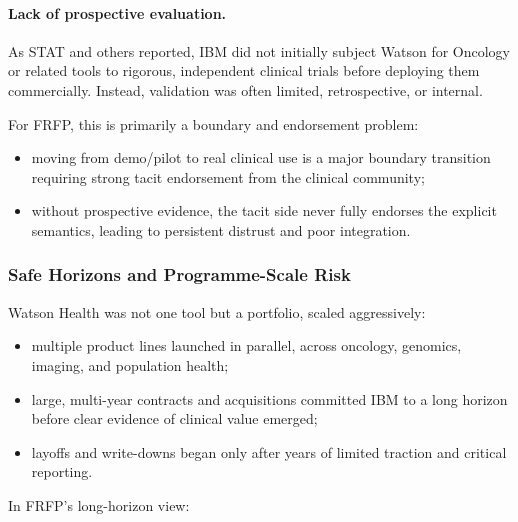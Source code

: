 \paragraph{Lack of prospective evaluation.}
As STAT and others reported, IBM did not initially subject Watson for
Oncology or related tools to rigorous, independent clinical trials before
deploying them commercially.
Instead, validation was often limited, retrospective, or internal.

For FRFP, this is primarily a boundary and endorsement problem:

\begin{itemize}
  \item moving from demo/pilot to real clinical use is a major boundary
        transition requiring strong tacit endorsement from the clinical
        community;
  \item without prospective evidence, the tacit side never fully endorses
        the explicit semantics, leading to persistent distrust and poor
        integration.
\end{itemize}

\subsubsection*{Safe Horizons and Programme-Scale Risk}

Watson Health was not one tool but a portfolio, scaled aggressively:

\begin{itemize}
  \item multiple product lines launched in parallel, across oncology,
        genomics, imaging, and population health;
  \item large, multi-year contracts and acquisitions committed IBM to a
        long horizon before clear evidence of clinical value emerged;
  \item layoffs and write-downs began only after years of limited traction
        and critical reporting.
\end{itemize}

In FRFP’s long-horizon view:

